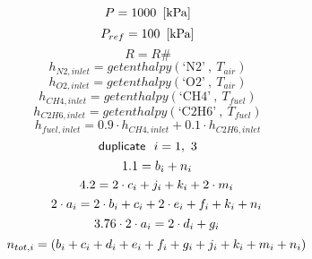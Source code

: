 \documentclass[10pt,fleqn]{article}
\newcommand{\F}[1]{\mbox{$#1$}}
\newcommand{\K}[1]{\mbox{\sf#1\ \ \mit}}
\newcommand{\SC}[1]{\mbox{`#1'}\  }
\newcommand{\I}{\mbox{\hspace{0.20in}}}
\begin{document}
\rm
\begin{equation}
\label{EES Eqn:13}
P      = 1000   \   \left[ \rm kPa \right] 
\end{equation}
\rm
\begin{equation}
\label{EES Eqn:14}
P_{ref} = 100    \   \left[ \rm kPa \right] 
\end{equation}
\rm
\begin{equation}
\label{EES Eqn:15}
R = R\# 
\end{equation}
\begin{equation}
\label{EES Eqn:16}
h_{N2,inlet} = \F{getenthalpy}{ \left( \SC{N2},\ T_{air} \right) } 
\end{equation}
\begin{equation}
\label{EES Eqn:17}
h_{O2,inlet} = \F{getenthalpy}{ \left( \SC{O2},\ T_{air} \right) } 
\end{equation}
\begin{equation}
\label{EES Eqn:18}
h_{CH4,inlet} = \F{getenthalpy}{ \left( \SC{CH4},\ T_{fuel} \right) } 
\end{equation}
\begin{equation}
\label{EES Eqn:19}
h_{C2H6,inlet} = \F{getenthalpy}{ \left( \SC{C2H6},\ T_{fuel} \right) } 
\end{equation}
\begin{equation}
\label{EES Eqn:20}
h_{fuel,inlet} = 0.9 \cdot  h_{CH4,inlet} + 0.1 \cdot  h_{C2H6,inlet} 
\end{equation}
\begin{equation}
\label{EES Eqn:21}
\K{duplicate} i=1,\ 3 
\end{equation}
\begin{equation}
\I \label{EES Eqn:22}
1.1 = b_{i} + n_{i} 
\end{equation}
\begin{equation}
\I \label{EES Eqn:23}
4.2 =  2 \cdot  c_{i} + j_{i} + k_{i} + 2 \cdot  m_{i} 
\end{equation}
\begin{equation}
\I \label{EES Eqn:24}
2 \cdot  a_{i} = 2 \cdot  b_{i} + c_{i} + 2 \cdot  e_{i} + f_{i} + k_{i} + n_{i} 
\end{equation}
\begin{equation}
\I \label{EES Eqn:25}
3.76 \cdot  2 \cdot  a_{i} = 2 \cdot  d_{i} + g_{i} 
\end{equation}
\begin{equation}
\I \label{EES Eqn:26}
n_{tot,i} =  \left( b_{i} +c_{i} +d_{i} +e_{i} +f_{i} +g_{i} + j_{i} + k_{i} + m_{i} + n_{i} \right)  
\end{equation}
\end{document}
